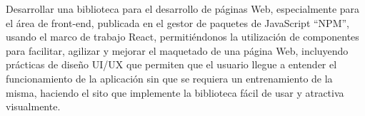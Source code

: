 Desarrollar una biblioteca para el desarrollo de páginas Web, especialmente para el área de front-end, publicada en el gestor de paquetes de JavaScript “NPM”, usando el marco de trabajo React, permitiéndonos la utilización de componentes para facilitar, agilizar y mejorar el maquetado de una página Web, incluyendo prácticas de diseño UI/UX que permiten que el usuario llegue a entender el funcionamiento de la aplicación sin que se requiera un entrenamiento de la misma, haciendo el sito que implemente la biblioteca fácil de usar y atractiva visualmente. 
